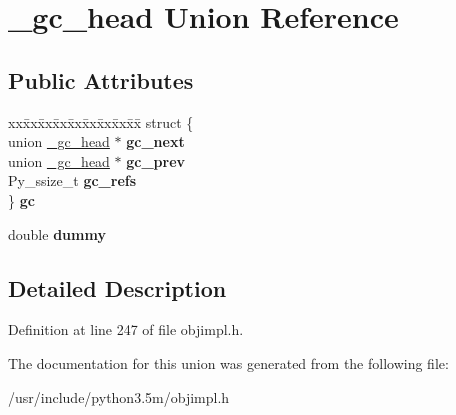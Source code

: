 \hypertarget{union__gc__head}{}\section{\+\_\+gc\+\_\+head Union Reference}
\label{union__gc__head}
\subsection*{Public Attributes}
\begin{DoxyCompactItemize}
\item 
\begin{tabbing}
xx\=xx\=xx\=xx\=xx\=xx\=xx\=xx\=xx\=\kill
struct \{\\
\>union \hyperlink{union__gc__head}{\_gc\_head} $\ast$ {\bfseries gc\_next}\\
\>union \hyperlink{union__gc__head}{\_gc\_head} $\ast$ {\bfseries gc\_prev}\\
\>Py\_ssize\_t {\bfseries gc\_refs}\\
\} {\bfseries gc}\hypertarget{union__gc__head_a05c5f0971f96866d85063fe3e7b943e3}{}\label{union__gc__head_a05c5f0971f96866d85063fe3e7b943e3}
\\

\end{tabbing}\item 
double {\bfseries dummy}\hypertarget{union__gc__head_a4f9caab38879dc1ff8b947935d4f5142}{}\label{union__gc__head_a4f9caab38879dc1ff8b947935d4f5142}

\end{DoxyCompactItemize}


\subsection{Detailed Description}


Definition at line 247 of file objimpl.\+h.



The documentation for this union was generated from the following file\+:\begin{DoxyCompactItemize}
\item 
/usr/include/python3.\+5m/objimpl.\+h\end{DoxyCompactItemize}
